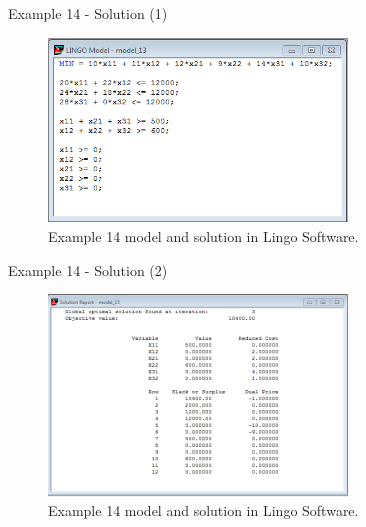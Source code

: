 \begin{frame}{Example 14 - Solution (1)}
\begin{figure}
    \includegraphics[width=300px]{slides/ex14/screenshot_a.png}
    \caption{Example 14 model and solution in Lingo Software.}
\end{figure}
\end{frame}

\begin{frame}{Example 14 - Solution (2)}
\begin{figure}
    \includegraphics[width=300px]{slides/ex14/screenshot_b.png}
    \caption{Example 14 model and solution in Lingo Software.}
\end{figure}
\end{frame}


